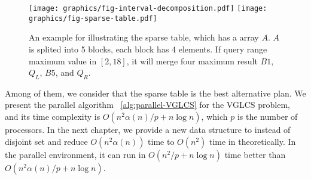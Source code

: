 \begin{figure*}[!thb]
  \centering
  \texttt{[image: graphics/fig-interval-decomposition.pdf]}
  \texttt{[image: graphics/fig-sparse-table.pdf]}
  \caption{An example for illustrating the sparse table, which has a array $A$. $A$ is splited into 5 blocks, each block has 4 elements. If query range maximum value in $[2, 18]$, it will merge four maximum result $B1$, $Q_L$, $B5$, and $Q_R$.}
  \label{fig:interval-decomposition}
\end{figure*}

Among of them, we consider that the sparse table is the best alternative plan.  We present the parallel algorithm ~\ref{alg:parallel-VGLCS} for the VGLCS problem, and its time complexity is $O(n^2 \alpha(n) / p + n \log n)$, which $p$ is the number of processors. In the next chapter, we provide a new data structure to instead of disjoint set and reduce $O(n^2 \alpha(n))$ time to $O(n^2)$ time in theoretically.  In the parallel environment, it can run in $O(n^2 /p + n \log n)$ time better than $O(n^2 \alpha(n)/p + n \log n)$.

